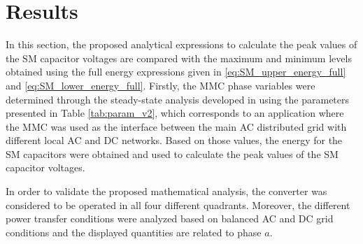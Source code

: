\documentclass[journal]{IEEEtran}
\begin{document}
\section{Results} \label{results}
In this section, the proposed analytical expressions to calculate the peak values of the SM capacitor voltages are compared with the maximum and minimum levels obtained using the full energy expressions given in \eqref{eq:SM_upper_energy_full} and \eqref{eq:SM_lower_energy_full}. Firstly, the MMC phase variables were determined through the steady-state analysis developed in \cite{IECON} using the parameters presented in Table \ref{tab:param_v2}, which corresponds to an application where the MMC was used as the interface between the main AC distributed grid with different local AC and DC networks. Based on those values, the energy for the SM capacitors were obtained and used to calculate the peak values of the SM capacitor voltages.

In order to validate the proposed mathematical analysis, the converter was considered to be operated in all four different quadrants. Moreover, the different power transfer conditions were analyzed based on balanced AC and DC grid conditions and the displayed quantities are related to phase $a$.
\end{document}
